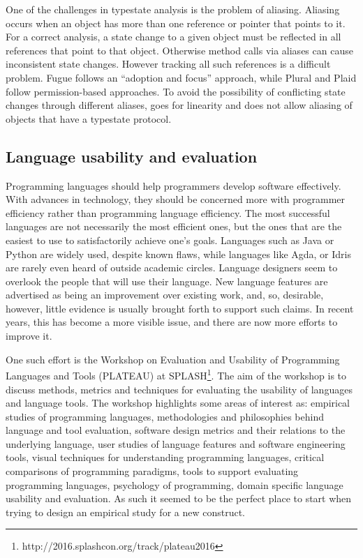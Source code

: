 One of the challenges in typestate analysis is the problem of aliasing. Aliasing occurs when an object has more than one reference or pointer that points to it. For a correct analysis, a state change to a given object must be reflected in all references that point to that object. Otherwise method calls via aliases can cause inconsistent state changes. However tracking all such references is a difficult problem. Fugue follows an ``adoption and focus'' approach, while Plural and Plaid follow permission-based approaches. To avoid the possibility of conflicting state changes through different aliases, \Mungo goes for linearity and does not allow aliasing of objects that have a typestate protocol.

\subsection{Language usability and evaluation}
\label{sub: evaluation}


Programming languages should help programmers develop software effectively. With advances in technology, they should be concerned more with programmer efficiency rather than programming language efficiency. The most successful languages are not necessarily the most efficient ones, but the ones that are the easiest to use to satisfactorily achieve one's goals. Languages such as Java or Python are widely used, despite known flaws, while languages like Agda, or Idris are rarely even heard of outside academic circles.
Language designers seem to overlook the people that will use their language. New language features are advertised as being an improvement over existing work, and, so, desirable, however, little evidence is usually brought forth to support such claims.
In recent years, this has become a more visible issue, and there are now more efforts to improve it.

One such effort is the Workshop on Evaluation and Usability of Programming Languages and Tools (PLATEAU) at SPLASH\footnote{http://2016.splashcon.org/track/plateau2016}. The aim of the workshop is to discuss methods, metrics and techniques for evaluating the usability of languages and language tools. The workshop highlights some areas of interest as: empirical studies of programming languages, methodologies and philosophies behind language and tool evaluation, software design metrics and their relations to the underlying language, user studies of language features and software engineering tools, visual techniques for understanding programming languages, critical comparisons of programming paradigms, tools to support evaluating programming languages, psychology of programming, domain specific language usability and evaluation.
As such it seemed to be the perfect place to start when trying to design an empirical study for a new construct.

